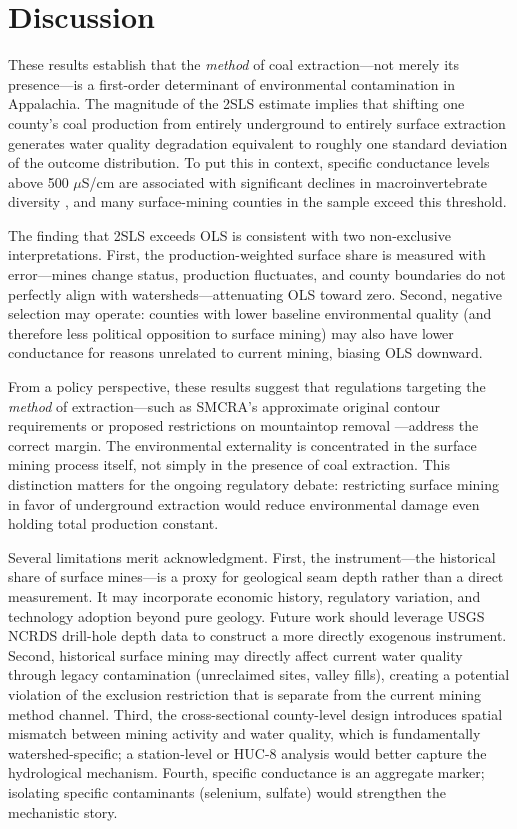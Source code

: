 \documentclass[12pt]{article}
\begin{document}
\section{Discussion}
\label{sec:discussion}

These results establish that the \textit{method} of coal extraction---not merely its presence---is a first-order determinant of environmental contamination in Appalachia. The magnitude of the 2SLS estimate implies that shifting one county's coal production from entirely underground to entirely surface extraction generates water quality degradation equivalent to roughly one standard deviation of the outcome distribution. To put this in context, specific conductance levels above 500 $\mu$S/cm are associated with significant declines in macroinvertebrate diversity \citep{pond2010patterns}, and many surface-mining counties in the sample exceed this threshold.

The finding that 2SLS exceeds OLS is consistent with two non-exclusive interpretations. First, the production-weighted surface share is measured with error---mines change status, production fluctuates, and county boundaries do not perfectly align with watersheds---attenuating OLS toward zero. Second, negative selection may operate: counties with lower baseline environmental quality (and therefore less political opposition to surface mining) may also have lower conductance for reasons unrelated to current mining, biasing OLS downward.

From a policy perspective, these results suggest that regulations targeting the \textit{method} of extraction---such as SMCRA's approximate original contour requirements or proposed restrictions on mountaintop removal \citep{palmer2010mountaintop}---address the correct margin. The environmental externality is concentrated in the surface mining process itself, not simply in the presence of coal extraction. This distinction matters for the ongoing regulatory debate: restricting surface mining in favor of underground extraction would reduce environmental damage even holding total production constant.

Several limitations merit acknowledgment. First, the instrument---the historical share of surface mines---is a proxy for geological seam depth rather than a direct measurement. It may incorporate economic history, regulatory variation, and technology adoption beyond pure geology. Future work should leverage USGS NCRDS drill-hole depth data to construct a more directly exogenous instrument. Second, historical surface mining may directly affect current water quality through legacy contamination (unreclaimed sites, valley fills), creating a potential violation of the exclusion restriction that is separate from the current mining method channel. Third, the cross-sectional county-level design introduces spatial mismatch between mining activity and water quality, which is fundamentally watershed-specific; a station-level or HUC-8 analysis would better capture the hydrological mechanism. Fourth, specific conductance is an aggregate marker; isolating specific contaminants (selenium, sulfate) would strengthen the mechanistic story.
\end{document}
